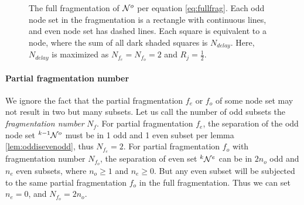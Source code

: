\begin{figure}
  \caption{The full fragmentation of $\mathcal{N}^o$ per equation \ref{eq:fullfrag}. Each odd node set in the fragmentation is a rectangle with continuous lines, and even node set has dashed lines. Each square is equivalent to a node, where the sum of all dark shaded squares is $N_{delay}$. Here, $N_{delay}$ is maximized as $N_{f_e} = N_{f_o} = 2$ and $R_j = \frac{1}{2}$. }\label{fig:fragcorrect}
\end{figure}

\paragraph{Partial fragmentation number}
We ignore the fact that the partial fragmentation $f_e$ or $f_o$ of some node set may not result in two but many subsets. Let us call the number of odd subsets the \emph{fragmentation number} $N_f$. For partial fragmentation $f_e$, the separation of the odd node set ${}^{k-1}\mathcal{N}^o$ must be in 1 odd and 1 even subset per lemma \ref{lem:oddisevenodd}, thus $N_{f_e} = 2$. For partial fragmentation $f_o$ with fragmentation number $N_{f_o}$, the separation of even set ${}^{k}\mathcal{N}^e$ can be in $2n_o$ odd and $n_e$ even subsets, where $n_o\geq 1$ and $n_e \geq 0$. But any even subset will be subjected to the same partial fragmentation $f_o$ in the full fragmentation. Thus we can set $n_e=0$, and $N_{f_o} = 2n_o$.

